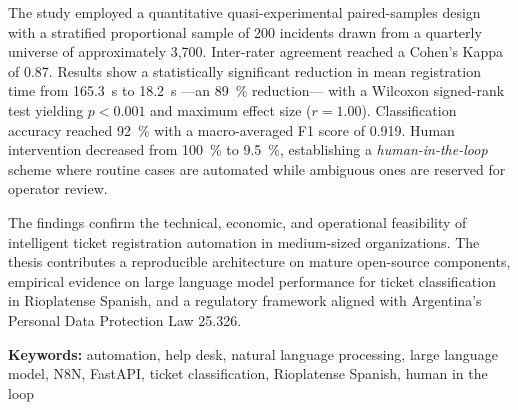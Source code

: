 The study employed a quantitative quasi-experimental paired-samples design with a stratified proportional sample of 200 incidents drawn from a quarterly universe of approximately 3,700. Inter-rater agreement reached a Cohen's Kappa of 0.87. Results show a statistically significant reduction in mean registration time from 165.3~s to 18.2~s ---an 89~\% reduction--- with a Wilcoxon signed-rank test yielding \(p < 0.001\) and maximum effect size (\(r = 1.00\)). Classification accuracy reached 92~\% with a macro-averaged F1 score of 0.919. Human intervention decreased from 100~\% to 9.5~\%, establishing a \emph{human-in-the-loop} scheme where routine cases are automated while ambiguous ones are reserved for operator review.

The findings confirm the technical, economic, and operational feasibility of intelligent ticket registration automation in medium-sized organizations. The thesis contributes a reproducible architecture on mature open-source components, empirical evidence on large language model performance for ticket classification in Rioplatense Spanish, and a regulatory framework aligned with Argentina's Personal Data Protection Law 25.326.

\bigskip
\noindent\textbf{Keywords:} automation, help desk, natural language processing, large language model, N8N, FastAPI, ticket classification, Rioplatense Spanish, human in the loop

\newpage
